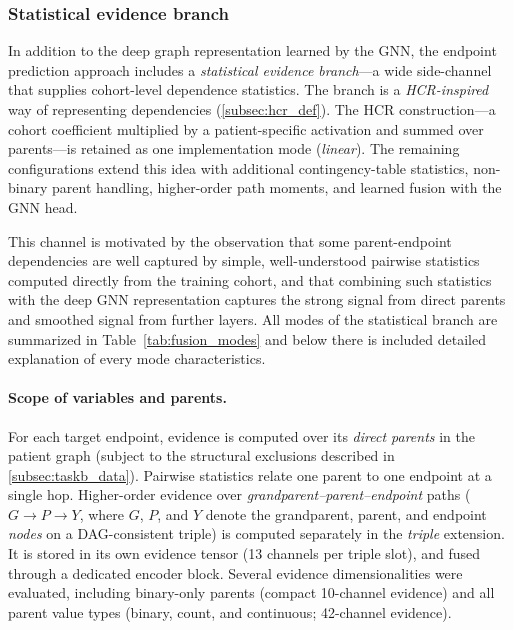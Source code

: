

\subsubsection{Statistical evidence branch}
\label{subsec:hcr_application}

In addition to the deep graph representation learned by the GNN, the endpoint
prediction approach includes a \emph{statistical evidence branch}---a wide
side-channel that supplies cohort-level dependence statistics.
The branch is a \emph{HCR-inspired} way of representing dependencies
(\cref{subsec:hcr_def}).
The HCR construction---a cohort coefficient multiplied by a
patient-specific activation and summed over parents---is retained as one
implementation mode (\emph{linear}).
The remaining configurations extend this idea with additional
contingency-table statistics, non-binary parent handling, higher-order path
moments, and learned fusion with the GNN head.

This channel is motivated by the 
observation that some parent-endpoint dependencies are well captured by simple, 
well-understood pairwise 
statistics computed directly from the training cohort, and that combining such statistics
 with the deep GNN 
representation captures the strong signal from direct parents and smoothed signal 
from further layers.
All modes of the statistical branch are summarized in
Table~\ref{tab:fusion_modes} and below there is included detailed explanation
of every mode characteristics.

\paragraph{Scope of variables and parents.}
For each target endpoint, evidence is computed over its \emph{direct parents}
in the patient graph (subject to the structural exclusions described in
\cref{subsec:taskb_data}).
Pairwise statistics relate one parent to one endpoint at a single hop.
Higher-order evidence over \emph{grandparent--parent--endpoint} paths
(\(G \rightarrow P \rightarrow Y\), where \(G\), \(P\), and \(Y\) denote the
grandparent, parent, and endpoint \emph{nodes} on a DAG-consistent triple) is computed separately in the
\emph{triple} extension.  It is
stored in its own evidence tensor (13 channels per triple slot), and fused 
through a dedicated encoder block.
Several evidence dimensionalities were evaluated, including binary-only
parents (compact 10-channel evidence) and all parent value types (binary,
count, and continuous; 42-channel evidence).

